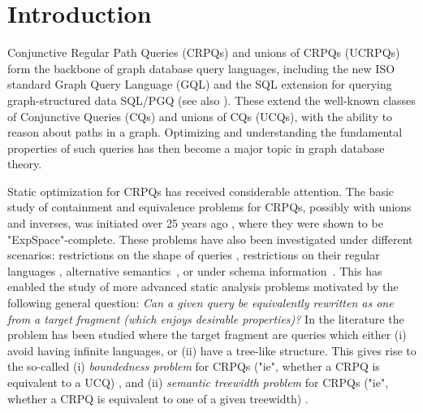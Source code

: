 \section{Introduction}
\AP\label{sec:intro}

Conjunctive Regular Path Queries (CRPQs) and unions of CRPQs (UCRPQs) form the backbone of graph database query languages, including the new ISO standard Graph Query Language (GQL) \cite{isoGQL} and the SQL extension for querying graph-structured data SQL/PGQ \cite{isoPGQ} (see also \cite{DBLP:conf/icdt/FrancisGGLMMMPR23,DBLP:conf/pods/FrancisGGLMMMPR23}).
These extend the well-known classes of Conjunctive Queries (CQs) and unions of CQs (UCQs), with the ability to reason about paths in a graph. 
Optimizing and understanding the fundamental properties of such queries has then become a major topic in graph database theory.

Static optimization for CRPQs has received considerable attention. The basic study of containment and equivalence problems for CRPQs, possibly with unions and inverses, was initiated over 25 years ago \cite{Florescu:CRPQ,four-italians}, where they were shown to be "ExpSpace"-complete. These problems have also been investigated under different scenarios: restrictions on the shape of queries \cite{figueira_containment_2020}, restrictions on their regular languages \cite{FigueiraGKMNT20}, alternative semantics~\cite{FigueiraRomero23}, or under schema information~\cite{GGIM-kr22,GGIM-pods24}.
This has enabled the study of more advanced static analysis problems motivated by the following general question: \emph{Can a given query be equivalently rewritten as one from a target fragment (which enjoys desirable properties)?}
In the literature the problem has been studied where the target fragment are queries which either (i) avoid having infinite languages, or (ii) have a tree-like structure. This gives rise to the so-called (i) \emph{boundedness problem} for CRPQs ("ie", whether a CRPQ is equivalent to a UCQ) \cite{BarceloF019,FigueiraAnanthaAl24}, and (ii) \emph{semantic treewidth problem} for CRPQs ("ie", whether a CRPQ is equivalent to one of a given treewidth) \cite{BarceloRV16,FM2023semantic,FeierGM24}.
	

